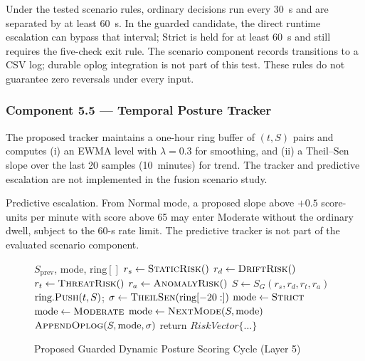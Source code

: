 \documentclass{ieeeaccess}
\renewcommand{\textbf}[1]{#1}
\begin{document}
\noindent Under the tested scenario rules, ordinary decisions run every 30~s and are separated by at least 60~s. In the guarded candidate, the direct runtime escalation can bypass that interval; Strict is held for at least 60~s and still requires the five-check exit rule. The scenario component records transitions to a CSV log; durable oplog integration is not part of this test. These rules do not guarantee zero reversals under every input.

\subsubsection{Component 5.5 --- Temporal Posture Tracker}
\label{subsubsec:temporal}

The proposed tracker maintains a one-hour ring buffer of $(t, S)$ pairs and computes (i) an EWMA level with $\lambda=0.3$ for smoothing, and (ii) a Theil--Sen slope over the last 20 samples (10~minutes) for trend. The tracker and predictive escalation are not implemented in the fusion scenario study.

\noindent\textbf{Predictive escalation.} From Normal mode, a proposed slope above $+0.5$ score-units per minute with score above 65 may enter Moderate without the ordinary dwell, subject to the 60-s rate limit. The predictive tracker is not part of the evaluated scenario component.

\begin{figure}[ht]
\caption{Proposed Guarded Dynamic Posture Scoring Cycle (Layer 5)}
\label{alg:posture}
\begin{algorithmic}[1]
\REQUIRE $S_{\text{prev}}$, $\text{mode}$, $\text{ring}[]$
\STATE $r_s \leftarrow \textsc{StaticRisk}()$ 
\STATE $r_d \leftarrow \textsc{DriftRisk}()$ 
\STATE $r_t \leftarrow \textsc{ThreatRisk}()$
\STATE $r_a \leftarrow \textsc{AnomalyRisk}()$ 
\STATE $S \leftarrow S_G(r_s,r_d,r_t,r_a)$ 
\STATE $\text{ring}.\textsc{Push}(t, S)$;\quad
       $\sigma \leftarrow \textsc{TheilSen}(\text{ring}[-20:])$
    \STATE $\text{mode} \leftarrow \textsc{Strict}$
        \STATE $\text{mode} \leftarrow \textsc{Moderate}$
    \ENDIF
{}
    \STATE $\text{mode} \leftarrow \textsc{NextMode}(S, \text{mode})$
\ENDIF
\STATE $\textsc{AppendOplog}(S, \text{mode}, \sigma)$
\STATE \textbf{return} $RiskVector\{\dots\}$
\end{algorithmic}
\end{figure}
\end{document}
